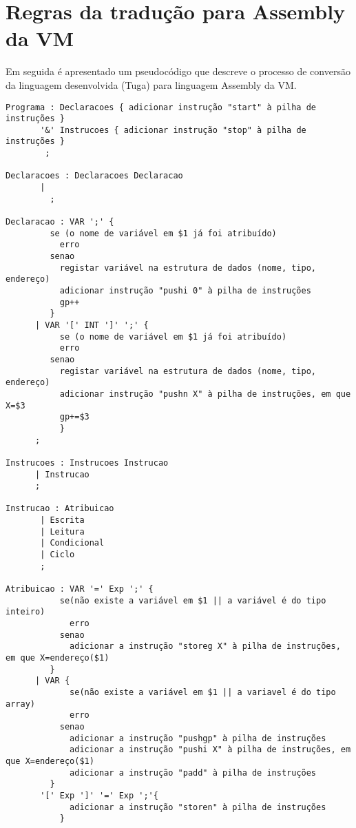 \documentclass{report}
\begin{document}
\chapter{Regras da tradução para Assembly da VM} \label{ae}

Em seguida é apresentado um pseudocódigo que descreve o processo de conversão da linguagem desenvolvida (Tuga) para linguagem Assembly da VM.

\begin{verbatim}
Programa : Declaracoes { adicionar instrução "start" à pilha de instruções }
       '&' Instrucoes { adicionar instrução "stop" à pilha de instruções }
        ;
 
Declaracoes : Declaracoes Declaracao
       |
         ;
 
Declaracao : VAR ';' {
         se (o nome de variável em $1 já foi atribuído)
           erro
         senao
           registar variável na estrutura de dados (nome, tipo, endereço)
           adicionar instrução "pushi 0" à pilha de instruções
           gp++
         }
      | VAR '[' INT ']' ';' {
           se (o nome de variável em $1 já foi atribuído)
           erro
         senao
           registar variável na estrutura de dados (nome, tipo, endereço)
           adicionar instrução "pushn X" à pilha de instruções, em que X=$3
           gp+=$3
           }
      ;
 
Instrucoes : Instrucoes Instrucao
      | Instrucao
      ;
 
Instrucao : Atribuicao
       | Escrita
       | Leitura
       | Condicional
       | Ciclo
       ;
 
Atribuicao : VAR '=' Exp ';' {
           se(não existe a variável em $1 || a variável é do tipo inteiro)
             erro
           senao
             adicionar a instrução "storeg X" à pilha de instruções, em que X=endereço($1)
         }
      | VAR {
             se(não existe a variável em $1 || a variavel é do tipo array)
             erro
           senao
             adicionar a instrução "pushgp" à pilha de instruções
             adicionar a instrução "pushi X" à pilha de instruções, em que X=endereço($1)
             adicionar a instrução "padd" à pilha de instruções
         }
       '[' Exp ']' '=' Exp ';'{
             adicionar a instrução "storen" à pilha de instruções
           }
 

\end{verbatim}
\end{document}
